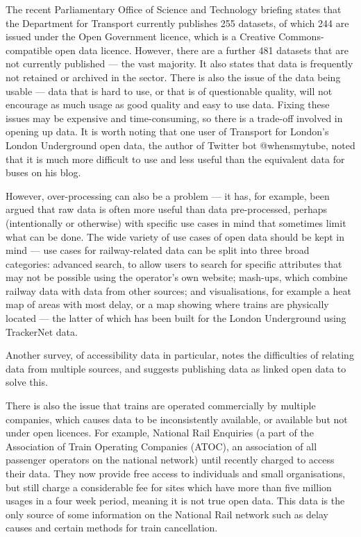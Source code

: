\documentclass[a4paper,12pt]{article}
\begin{document}
The recent Parliamentary Office of Science and Technology
briefing\cite{POSTnote472} states that the Department for Transport currently
publishes 255 datasets, of which 244 are issued under the Open Government
licence, which is a Creative Commons-compatible open data licence. However,
there are a further 481 datasets that are not currently published --- the vast
majority. It also states that data is frequently not retained or archived in
the sector. There is also the issue of the data being usable --- data that is
hard to use, or that is of questionable quality, will not encourage as much
usage as good quality and easy to use data. Fixing these issues may be
expensive and time-consuming, so there is a trade-off involved in opening up
data. It is worth noting that one user of Transport for London's London
Underground open data, the author of Twitter bot @whensmytube, noted that it is
much more difficult to use and less useful than the equivalent data for buses
on his blog\cite{whensmytube}.

However, over-processing can also be a problem --- it has, for example, been
argued that raw data is often more useful than data pre-processed, perhaps
(intentionally or otherwise) with specific use cases in mind that sometimes
limit what can be done\cite{Robinson2009}. The wide variety of use cases of
open data should be kept in mind --- use cases for railway-related data can be
split into three broad categories\cite{Kuhn2011}: advanced search, to allow
users to search for specific attributes that may not be possible using the
operator's own website; mash-ups, which combine railway data with data from
other sources; and visualisations, for example a heat map of areas with most
delay, or a map showing where trains are physically located --- the latter of
which has been built for the London Underground using TrackerNet
data\cite{TrainTimesTube}.

Another survey, of accessibility data in particular, notes the difficulties of
relating data from multiple sources, and suggests publishing data as linked
open data to solve this\cite{Ding2014}.

There is also the issue that trains are operated commercially by multiple
companies, which causes data to be inconsistently available, or available but
not under open licences. For example, National Rail Enquiries (a part of the
Association of Train Operating Companies (ATOC), an association of all
passenger operators on the national network) until recently charged to access
their data. They now provide free access to individuals and small
organisations, but still charge a considerable fee for sites which have more
than five million usages in a four week period, meaning it is not true open
data. This data is the only source of some information on the National Rail
network such as delay causes and certain methods for train
cancellation\cite{CairnsSeminar2013}.
\end{document}
